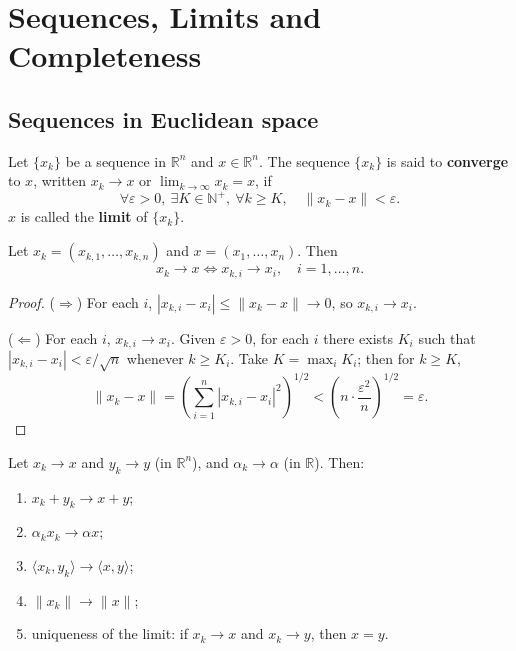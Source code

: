 \section{Sequences, Limits and Completeness}

\subsection{Sequences in Euclidean space}

\begin{definition}\label{def:sequence_convergence}
Let $\{x_k\}$ be a sequence in $\mathbb{R}^n$ and $x \in \mathbb{R}^n$. The sequence $\{x_k\}$ is said to \textbf{converge} to $x$, written $x_k \to x$ or $\lim_{k \to \infty} x_k = x$, if
\[
\forall \varepsilon > 0,\ \exists K \in \mathbb{N}^+,\ \forall k \ge K,\quad \|x_k - x\| < \varepsilon.
\]
$x$ is called the \textbf{limit} of $\{x_k\}$.
\end{definition}

\begin{proposition}\label{prop:coordinate_convergence}
Let $x_k = (x_{k,1}, \dots, x_{k,n})$ and $x = (x_1, \dots, x_n)$. Then
\[
x_k \to x \iff x_{k,i} \to x_i,\quad i = 1, \dots, n.
\]
\end{proposition}

\begin{proof}
($\Rightarrow$) For each $i$, $|x_{k,i} - x_i| \le \|x_k - x\| \to 0$, so $x_{k,i} \to x_i$.

($\Leftarrow$) For each $i$, $x_{k,i} \to x_i$. Given $\varepsilon > 0$, for each $i$ there exists $K_i$ such that $|x_{k,i} - x_i| < \varepsilon/\sqrt{n}$ whenever $k \ge K_i$. Take $K = \max_i K_i$; then for $k \ge K$,
\[
\|x_k - x\| = \left( \sum_{i=1}^{n} |x_{k,i} - x_i|^2 \right)^{1/2} < \left( n \cdot \frac{\varepsilon^2}{n} \right)^{1/2} = \varepsilon.
\]
\end{proof}

\begin{proposition}\label{prop:limit_operations_ra}
Let $x_k \to x$ and $y_k \to y$ (in $\mathbb{R}^n$), and $\alpha_k \to \alpha$ (in $\mathbb{R}$). Then:
\begin{enumerate}[label=(\roman*)]
    \item $x_k + y_k \to x + y$;
    \item $\alpha_k x_k \to \alpha x$;
    \item $\langle x_k, y_k \rangle \to \langle x, y \rangle$;
    \item $\|x_k\| \to \|x\|$;
    \item uniqueness of the limit: if $x_k \to x$ and $x_k \to y$, then $x = y$.
\end{enumerate}
\end{proposition}

